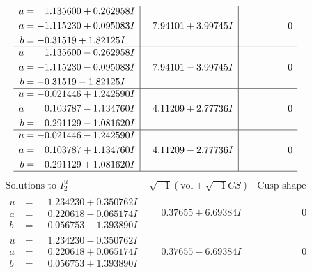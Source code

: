 \documentclass[1p]{elsarticle_modified}
\theoremstyle{definition}
\newcommand{\I}{\sqrt{-1}}
\begin{document}
$$\begin{array}{c|c|c}
\begin{aligned}
u &= \phantom{-}1.135600 + 0.262958 I \\
a &= -1.115230 + 0.095083 I \\
b &= -0.31519 + 1.82125 I\end{aligned}
 & \phantom{-}7.94101 + 3.99745 I & \phantom{-0.000000 } 0 \\ \hline\begin{aligned}
u &= \phantom{-}1.135600 - 0.262958 I \\
a &= -1.115230 - 0.095083 I \\
b &= -0.31519 - 1.82125 I\end{aligned}
 & \phantom{-}7.94101 - 3.99745 I & \phantom{-0.000000 } 0 \\ \hline\begin{aligned}
u &= -0.021446 + 1.242590 I \\
a &= \phantom{-}0.103787 - 1.134760 I \\
b &= \phantom{-}0.291129 - 1.081620 I\end{aligned}
 & \phantom{-}4.11209 + 2.77736 I & \phantom{-0.000000 } 0 \\ \hline\begin{aligned}
u &= -0.021446 - 1.242590 I \\
a &= \phantom{-}0.103787 + 1.134760 I \\
b &= \phantom{-}0.291129 + 1.081620 I\end{aligned}
 & \phantom{-}4.11209 - 2.77736 I & \phantom{-0.000000 } 0\\
 \hline 
 \end{array}$$\newpage$$\begin{array}{c|c|c}  
\text{Solutions to }I^u_{2}& \I (\text{vol} + \sqrt{-1}CS) & \text{Cusp shape}\\
 \hline 
\begin{aligned}
u &= \phantom{-}1.234230 + 0.350762 I \\
a &= \phantom{-}0.220618 - 0.065174 I \\
b &= \phantom{-}0.056753 - 1.393890 I\end{aligned}
 & \phantom{-}0.37655 + 6.69384 I & \phantom{-0.000000 } 0 \\ \hline\begin{aligned}
u &= \phantom{-}1.234230 - 0.350762 I \\
a &= \phantom{-}0.220618 + 0.065174 I \\
b &= \phantom{-}0.056753 + 1.393890 I\end{aligned}
 & \phantom{-}0.37655 - 6.69384 I & \phantom{-0.000000 } 0 \\ \hline\begin{aligned}

\end{aligned}
\end{array}$$
\end{document}
